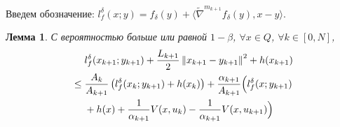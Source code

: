 \documentclass[11pt,a4]{article}
\newcommand{\norm}[1]{\left\lVert#1\right\rVert}
\newtheorem{lemma}{Лемма}
\begin{document}
Введем обозначение: $l_f^\delta(x;y) = f_\delta(y) + \langle \widetilde{\nabla}^{m_{k+1}} f_\delta(y), x - y \rangle$.
\begin{lemma}
	С вероятностью больше или равной $1 - \beta$, $\forall x \in Q$, $\forall k \in [0,N]$,
	\begin{align*}
		&\hphantom{{}={}}l_f^\delta(x_{k+1};y_{k+1})  + \frac{L_{k+1}}{2}\norm{x_{k+1} - y_{k+1}}^2 + h(x_{k+1}) \\&\leq \frac{A_k}{A_{k+1}}\left(l_f^\delta(x_k;y_{k+1}) + h(x_k)\right) +
			 \frac{\alpha_{k+1}}{A_{k+1}}\Bigl(l_f^\delta(x;y_{k+1}) \\&\hphantom{{}={}}+ h(x)
			 + \frac{1}{\alpha_{k+1}}V(x, u_k) - \frac{1}{\alpha_{k+1}}V(x, u_{k+1})\Bigl)
	\end{align*}
	\label{lemma_maxmin_3DLST}
\end{lemma}
\end{document}
